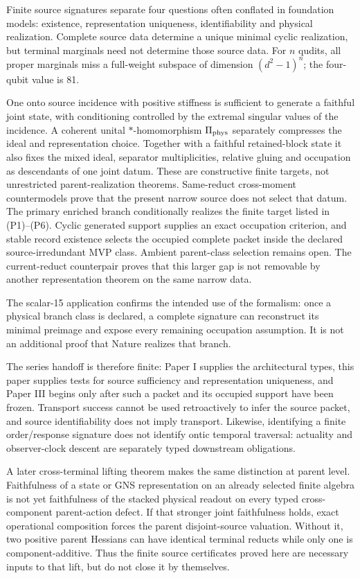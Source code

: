 \documentclass[11pt]{article}
\begin{document}
Finite source signatures separate four questions often conflated in
foundation models: existence, representation uniqueness, identifiability and
physical realization.  Complete source data determine a unique minimal cyclic
realization, but terminal marginals need not determine those source data.  For
\(n\) qudits, all proper marginals miss a full-weight subspace of dimension
\((d^2-1)^n\); the four-qubit value is 81.

One onto source incidence with positive stiffness is sufficient to generate a
faithful joint state, with conditioning controlled by the extremal singular
values of the incidence.  A coherent unital \(*\)-homomorphism
\(\Pi_{\rm phys}\) separately compresses the ideal and representation choice.
Together with a faithful retained-block state it also fixes the mixed ideal,
separator multiplicities, relative gluing and occupation as descendants of
one joint datum.  These are constructive finite targets, not unrestricted
parent-realization theorems.  Same-reduct cross-moment countermodels prove
that the present narrow source does not select that datum.
The primary enriched branch conditionally realizes the finite target listed in
(P1)--(P6). Cyclic generated support supplies an exact occupation criterion,
and stable record existence selects the occupied complete packet inside the
declared source-irredundant MVP class. Ambient parent-class selection remains
open. The current-reduct counterpair proves that this larger gap is not
removable by another representation theorem on the same narrow data.

The scalar-15 application confirms the intended use of the formalism: once a
physical branch class is declared, a complete signature can reconstruct its
minimal preimage and expose every remaining occupation assumption.  It is not
an additional proof that Nature realizes that branch.

The series handoff is therefore finite: Paper I supplies the architectural
types, this paper supplies tests for source sufficiency and representation
uniqueness, and Paper III begins only after such a packet and its occupied
support have been frozen.  Transport success cannot be used retroactively to
infer the source packet, and source identifiability does not imply transport.
Likewise, identifying a finite order/response signature does not identify
ontic temporal traversal: actuality and observer-clock descent are separately
typed downstream obligations.

A later cross-terminal lifting theorem makes the same distinction at parent
level. Faithfulness of a state or GNS representation on an already selected
finite algebra is not yet faithfulness of the stacked physical readout on
every typed cross-component parent-action defect. If that stronger joint
faithfulness holds, exact operational composition forces the parent
disjoint-source valuation. Without it, two positive parent Hessians can have
identical terminal reducts while only one is component-additive. Thus the
finite source certificates proved here are necessary inputs to that lift, but
do not close it by themselves.
\end{document}
